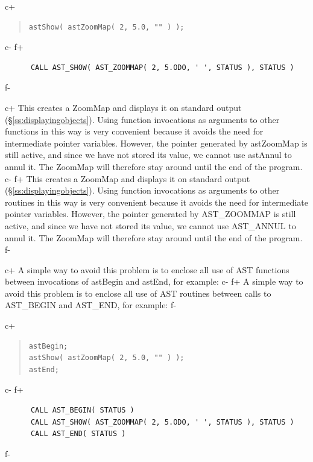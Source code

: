 \documentclass[twoside,11pt]{article}
\newcommand{\secref}[1]{\S\ref{#1}}
\newcommand{\secref}[1]{\ref{#1}}
\begin{document}
c+
\begin{quote}
\small
\begin{verbatim}
astShow( astZoomMap( 2, 5.0, "" ) );
\end{verbatim}
\normalsize
\end{quote}
c-
f+
\small
\begin{verbatim}
      CALL AST_SHOW( AST_ZOOMMAP( 2, 5.ODO, ' ', STATUS ), STATUS )
\end{verbatim}
\normalsize
f-

c+
This creates a ZoomMap and displays it on standard output
(\secref{ss:displayingobjects}). Using function invocations as
arguments to other functions in this way is very convenient because it
avoids the need for intermediate pointer variables. However, the
pointer generated by astZoomMap is still active, and since we have not
stored its value, we cannot use astAnnul to annul it. The ZoomMap will
therefore stay around until the end of the program.
c-
f+
This creates a ZoomMap and displays it on standard output
(\secref{ss:displayingobjects}). Using function invocations as
arguments to other routines in this way is very convenient because it
avoids the need for intermediate pointer variables. However, the
pointer generated by AST\_ZOOMMAP is still active, and since we have
not stored its value, we cannot use AST\_ANNUL to annul it. The
ZoomMap will therefore stay around until the end of the program.
f-

c+
A simple way to avoid this problem is to enclose all use of AST
functions between invocations of astBegin and astEnd, for example:
c-
f+
A simple way to avoid this problem is to enclose all use of AST
routines between calls to AST\_BEGIN and AST\_END, for example:
f-

c+
\begin{quote}
\small
\begin{verbatim}
astBegin;
astShow( astZoomMap( 2, 5.0, "" ) );
astEnd;
\end{verbatim}
\normalsize
\end{quote}
c-
f+
\small
\begin{verbatim}
      CALL AST_BEGIN( STATUS )
      CALL AST_SHOW( AST_ZOOMMAP( 2, 5.ODO, ' ', STATUS ), STATUS )
      CALL AST_END( STATUS )
\end{verbatim}
\normalsize
f-
\end{document}
